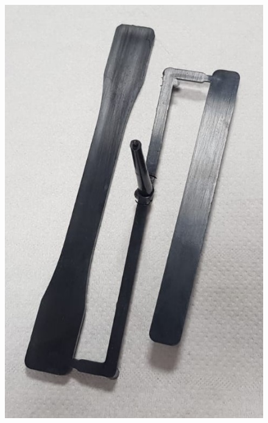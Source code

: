 \documentclass[a4paper, 11pt]{article}
\begin{document}
\begin{figure}[htp]
{\includegraphics[scale=0.25]{PE-PP}} \qquad
\subfloat[][]

\end{figure}
\end{document}
